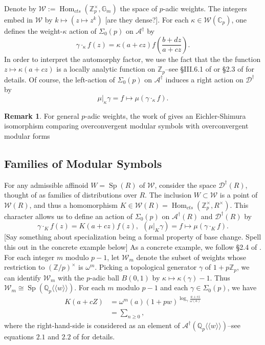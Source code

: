 \documentclass[10pt]{amsart}
\theoremstyle{plain}
\theoremstyle{definition}
\newtheorem{remark}[theorem]{Remark}
\newcommand{\ZZ}{{\mathbb{Z}}}
\newcommand{\CC}{{\mathbb{C}}}
\newcommand{\QQ}{{\mathbb{Q}}}
\newcommand{\cA}{\mathcal{A}}
\newcommand{\cD}{\mathcal{D}}
\newcommand{\cW}{\mathcal{W}}
\newcommand{\G}{\mathbb{G}}
\DeclareMathOperator{\Hom}{Hom}
\DeclareMathOperator{\Sp}{Sp}
\begin{document}
Denote by $\cW:=\Hom_{cts}(\ZZ_p^\times,\G_m)$ the space of $p$-adic weights. The integers embed in $\cW$ by $k\mapsto (z\mapsto z^k)$ [are they dense?]. For each $\kappa\in \cW(\CC_p)$, one defines the weight-$\kappa$ action of $\Sigma_0(p)$ on $\cA^\dagger$ by
\begin{equation*}
	\gamma \cdot_\kappa f(z) = \kappa(a+cz) f\left(\frac{b+dz}{a+cz}\right).
\end{equation*}
In order to interpret the automorphy factor, we use the fact that the the function $z\mapsto \kappa(a+cz)$ is a locally analytic function on $\ZZ_p$--see \S III.6.1 of \cite{Bellaiche} or \S2.3 of \cite{Robs} for details.
Of course, the left-action of $\Sigma_0(p)$ on $\cA^\dagger$ induces a right action on $\cD^\dagger$ by
\begin{equation*}
	\mu|_\kappa \gamma = f\mapsto \mu( \gamma\cdot_\kappa f).
\end{equation*}
\begin{remark}
For general $p$-adic weights, the work of \cite{Andreatta, Iovita, Stevens} gives an Eichler-Shimura isomorphism comparing overconvergent modular symbols with overconvergent modular forms
\end{remark}

\subsection{Families of Modular Symbols}
For any admissible affinoid $W=\Sp(R)$ of $\cW$, consider the space $\cD^\dagger(R)$, thought of as families of distributions over $R$. The inclusion $W\subset \cW$ is a point of $\cW(R)$, and thus a homomorphism $K\in \cW(R)=\Hom_{cts}(\ZZ_p^\times,R^\times)$. This character allows us to define an action of $\Sigma_0(p)$ on $\cA^\dagger(R)$ and $\cD^\dagger(R)$ by
\begin{equation}
	\gamma \cdot_K f(z) = K(a+cz) f(z), ~~ (\mu|_K\gamma)= f\mapsto \mu(\gamma\cdot_K f).
\end{equation}
[Say something about specialization being a formal property of base change. Spell this out in the concrete example below]
As a concrete example, we follow \S2.4 of \cite{Robs}. For each integer $m$ modulo $p-1$, let $\cW_m$ denote the subset of weights whose restriction to $(\ZZ/p)^\times$ is $\omega^m$. Picking a topological generator $\gamma$ of $1+p\ZZ_p$, we can identify $\cW_m$ with the $p$-adic ball $B(0,1)$ by $\kappa \mapsto \kappa(\gamma)-1$. Thus $\cW_m \cong \Sp(\QQ_p\langle \langle w \rangle\rangle)$. For each $m$ modulo $p-1$ and each $\gamma \in \Sigma_0(p)$, we have
\begin{align*}
	K(a+cZ)  &= \omega^m(a) (1+pw)^{\log_\gamma\frac{a+cz}{\omega(a)}}\\
	&=\sum_{n\geq 0},
\end{align*}
where the right-hand-side is considered as an element of $\cA^\dagger(\QQ_p\langle \langle w \rangle\rangle)$--see equations $2.1$ and $2.2$ of \cite{Robs} for details.
\end{document}
